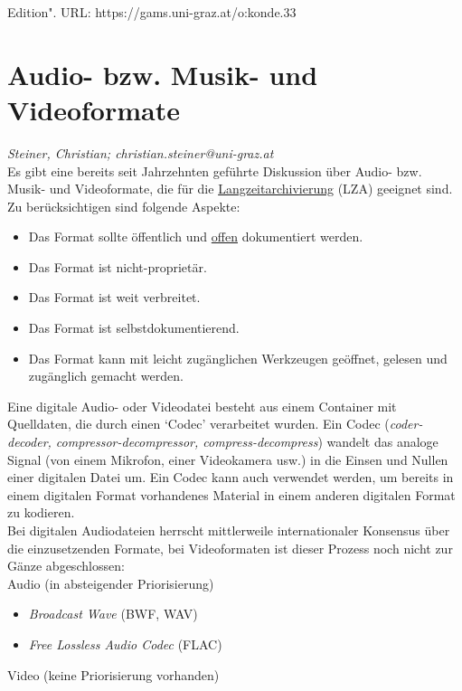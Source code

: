 \documentclass{article}
\begin{document}
Edition". URL: https://gams.uni-graz.at/o:konde.33\newpage\section*{Audio- bzw. Musik- und Videoformate} \emph{Steiner, Christian; christian.steiner@uni-graz.at}\\
        
    Es gibt eine bereits seit Jahrzehnten geführte Diskussion über Audio- bzw. Musik- und Videoformate, die für die \href{http://gams.uni-graz.at/o:konde.6}{Langzeitarchivierung} (LZA) geeignet sind. Zu berücksichtigen sind folgende Aspekte:\\
            
        \begin{itemize}\item {Das Format sollte öffentlich und \href{http://gams.uni-graz.at/o:konde.152}{offen} dokumentiert werden.}\item {Das Format ist nicht-proprietär.}\item {Das Format ist weit verbreitet.}\item {Das Format ist selbstdokumentierend.}\item {Das Format kann mit leicht zugänglichen Werkzeugen geöffnet, gelesen und zugänglich gemacht werden.}\end{itemize}Eine digitale Audio- oder Videodatei besteht aus einem Container mit Quelldaten, die durch einen ‘Codec’ verarbeitet wurden. Ein Codec (\emph{coder-decoder, compressor-decompressor, compress-decompress}) wandelt das analoge Signal (von einem Mikrofon, einer Videokamera usw.) in die Einsen und Nullen einer digitalen Datei um. Ein Codec kann auch verwendet werden, um bereits in einem digitalen Format vorhandenes Material in einem anderen digitalen Format zu kodieren.\\
            
        Bei digitalen Audiodateien herrscht mittlerweile internationaler Konsensus über die einzusetzenden Formate, bei Videoformaten ist dieser Prozess noch nicht zur Gänze abgeschlossen:\\
            
        Audio (in absteigender Priorisierung)\\
            
        \begin{itemize}\item {\emph{Broadcast Wave }(BWF, WAV)}\item {\emph{Free Lossless Audio Codec} (FLAC)}\end{itemize}Video (keine Priorisierung vorhanden)\\
            
\end{document}
